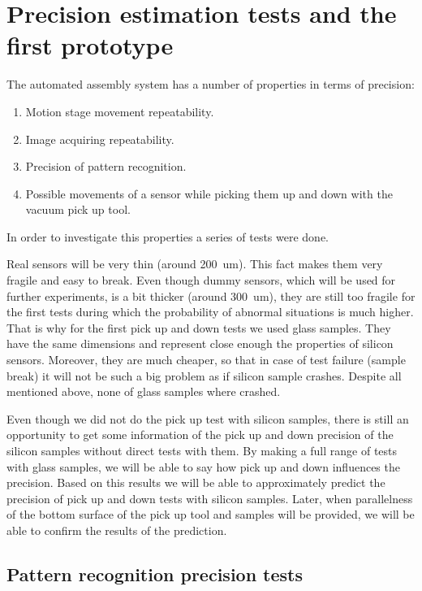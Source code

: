 \chapter{Precision estimation tests and the first prototype}
The automated assembly system has a number of properties in terms of precision:
\begin{enumerate}
\setlength\itemsep{-0.5em}
\item Motion stage movement repeatability.
\item Image acquiring repeatability.
\item Precision of pattern recognition.
\item Possible movements of a sensor while picking them up and down with the vacuum pick up tool.
\end{enumerate}

In order to investigate this properties a series of tests were done.

Real sensors will be very thin (around 200~um). This fact makes them very fragile and easy to break. Even though dummy sensors, which will be used for further experiments, is a bit thicker (around 300~um), they are still too fragile for the first tests during which the probability of abnormal situations is much higher. That is why for the first pick up and down tests we used glass samples. They have the same dimensions and represent close enough the properties of silicon sensors. Moreover, they are much cheaper, so that in case of test failure (sample break) it will not be such a big problem as if silicon sample crashes. Despite all mentioned above, none of glass samples where crashed.

Even though we did not do the pick up test with silicon samples, there is still an opportunity to get some information of the pick up and down precision of the silicon samples without direct tests with them. By making a full range of tests with glass samples, we will be able to say how pick up and down influences the precision. Based on this results we will be able to approximately predict the precision of pick up and down tests with silicon samples. Later, when parallelness of the bottom surface of the pick up tool and samples will be provided, we will be able to confirm the results of the prediction.

\section{Pattern recognition precision tests}

